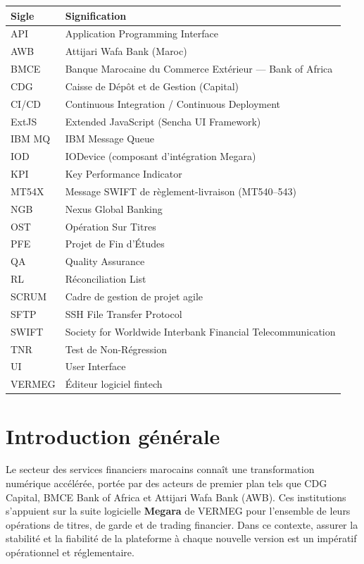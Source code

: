 \documentclass[12pt, a4paper]{report}
\begin{document}
\begin{tabular}{@{}lp{11cm}@{}}
\toprule
\textbf{Sigle} & \textbf{Signification} \\
\midrule
API    & Application Programming Interface \\
AWB    & Attijari Wafa Bank (Maroc) \\
BMCE   & Banque Marocaine du Commerce Extérieur — Bank of Africa \\
CDG    & Caisse de Dépôt et de Gestion (Capital) \\
CI/CD  & Continuous Integration / Continuous Deployment \\
ExtJS  & Extended JavaScript (Sencha UI Framework) \\
IBM MQ & IBM Message Queue \\
IOD    & IODevice (composant d'intégration Megara) \\
KPI    & Key Performance Indicator \\
MT54X  & Message SWIFT de règlement-livraison (MT540–543) \\
NGB    & Nexus Global Banking \\
OST    & Opération Sur Titres \\
PFE    & Projet de Fin d'Études \\
QA     & Quality Assurance \\
RL     & Réconciliation List \\
SCRUM  & Cadre de gestion de projet agile \\
SFTP   & SSH File Transfer Protocol \\
SWIFT  & Society for Worldwide Interbank Financial Telecommunication \\
TNR    & Test de Non-Régression \\
UI     & User Interface \\
VERMEG & Éditeur logiciel fintech \\
\bottomrule
\end{tabular}
\newpage

\chapter*{Introduction générale}

Le secteur des services financiers marocains connaît une transformation numérique accélérée, portée par des acteurs de premier plan tels que CDG Capital, BMCE Bank of Africa et Attijari Wafa Bank (AWB). Ces institutions s'appuient sur la suite logicielle \textbf{Megara} de VERMEG pour l'ensemble de leurs opérations de titres, de garde et de trading financier. Dans ce contexte, assurer la stabilité et la fiabilité de la plateforme à chaque nouvelle version est un impératif opérationnel et réglementaire.
\end{document}
